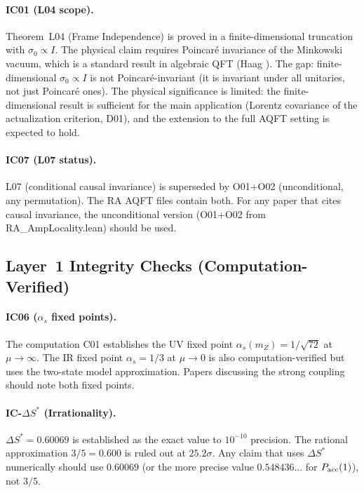 \documentclass[12pt,a4paper]{article}
\begin{document}
\paragraph{IC01 (L04 scope).}
Theorem~L04 (Frame Independence) is proved in a finite-dimensional truncation with $\sigma_0\propto I$.  The physical claim requires Poincar\'e invariance of the Minkowski vacuum, which is a standard result in algebraic QFT (Haag \cite{Haag1996}).  The gap: finite-dimensional $\sigma_0\propto I$ is not Poincar\'e-invariant (it is invariant under all unitaries, not just Poincar\'e ones).  The physical significance is limited: the finite-dimensional result is sufficient for the main application (Lorentz covariance of the actualization criterion, D01), and the extension to the full AQFT setting is expected to hold.

\paragraph{IC07 (L07 status).}
L07 (conditional causal invariance) is superseded by O01+O02 (unconditional, any permutation).  The RA AQFT files contain both.  For any paper that cites causal invariance, the unconditional version (O01+O02 from RA\_AmpLocality.lean) should be used.

\subsection{Layer~1 Integrity Checks (Computation-Verified)}

\paragraph{IC06 ($\alpha_s$ fixed points).}
The computation C01 establishes the UV fixed point $\alpha_s(m_Z)=1/\sqrt{72}$ at $\mu\to\infty$.  The IR fixed point $\alpha_s=1/3$ at $\mu\to0$ is also computation-verified but uses the two-state model approximation.  Papers discussing the strong coupling should note both fixed points.

\paragraph{IC-$\Delta S^*$ (Irrationality).}
$\Delta S^*=0.60069$ is established as the exact value to $10^{-10}$ precision.  The rational approximation $3/5=0.600$ is ruled out at $25.2\sigma$.  Any claim that uses $\Delta S^*$ numerically should use $0.60069$ (or the more precise value $0.548436...$ for $P_{\rm acc}(1)$), not $3/5$.
\end{document}
